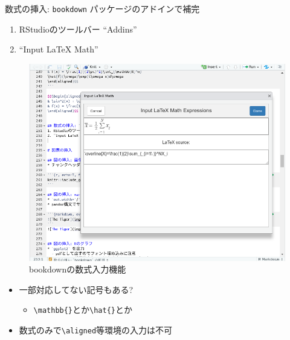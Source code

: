 \documentclass[
  12pt,
  ignorenonframetext,
]{beamer}
\providecommand{\tightlist}{%
  \setlength{\itemsep}{0pt}\setlength{\parskip}{0pt}}
\begin{document}
\begin{frame}[fragile]{数式の挿入: \texttt{bookdown}
パッケージのアドインで補完}
\protect\hypertarget{ux6570ux5f0fux306eux633fux5165-bookdown-ux30d1ux30c3ux30b1ux30fcux30b8ux306eux30a2ux30c9ux30a4ux30f3ux3067ux88dcux5b8c}{}

\begin{enumerate}
\tightlist
\item
  RStudioのツールバー ``Addins''
\item
  ``Input LaTeX Math''
\end{enumerate}

\begin{figure}

{\centering \includegraphics[width=1\linewidth,height=0.4\textheight]{img/math-input} 

}

\caption{bookdownの数式入力機能}\label{fig:math-input}
\end{figure}

\begin{itemize}
\tightlist
\item
  一部対応してない記号もある?

  \begin{itemize}
  \tightlist
  \item
    \texttt{\textbackslash{}mathbb\{\}}とか\texttt{\textbackslash{}hat\{\}}とか
  \end{itemize}
\item
  数式のみで\texttt{\textbackslash{}aligned}等環境の入力は不可
\end{itemize}

\end{frame}
\end{document}
